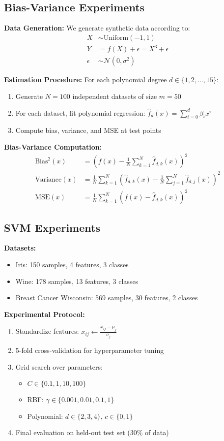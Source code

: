 \documentclass[12pt, a4paper]{article}
\begin{document}
\subsection{Bias-Variance Experiments}

\textbf{Data Generation:}
We generate synthetic data according to:
\begin{align}
X &\sim \text{Uniform}(-1, 1) \\
Y &= f(X) + \epsilon = X^3 + \epsilon \\
\epsilon &\sim \mathcal{N}(0, \sigma^2)
\end{align}

\textbf{Estimation Procedure:}
For each polynomial degree $d \in \{1, 2, \ldots, 15\}$:
\begin{enumerate}
\item Generate $N = 100$ independent datasets of size $m = 50$
\item For each dataset, fit polynomial regression: $\hat{f}_d(x) = \sum_{i=0}^d \beta_i x^i$
\item Compute bias, variance, and MSE at test points
\end{enumerate}

\textbf{Bias-Variance Computation:}
\begin{align}
\text{Bias}^2(x) &= (f(x) - \frac{1}{N}\sum_{k=1}^N \hat{f}_{d,k}(x))^2 \\
\text{Variance}(x) &= \frac{1}{N}\sum_{k=1}^N (\hat{f}_{d,k}(x) - \frac{1}{N}\sum_{j=1}^N \hat{f}_{d,j}(x))^2 \\
\text{MSE}(x) &= \frac{1}{N}\sum_{k=1}^N (f(x) - \hat{f}_{d,k}(x))^2
\end{align}

\subsection{SVM Experiments}

\textbf{Datasets:}
\begin{itemize}
\item Iris: 150 samples, 4 features, 3 classes
\item Wine: 178 samples, 13 features, 3 classes  
\item Breast Cancer Wisconsin: 569 samples, 30 features, 2 classes
\end{itemize}

\textbf{Experimental Protocol:}
\begin{enumerate}
\item Standardize features: $x_{ij} \leftarrow \frac{x_{ij} - \mu_j}{\sigma_j}$
\item 5-fold cross-validation for hyperparameter tuning
\item Grid search over parameters:
   \begin{itemize}
   \item $C \in \{0.1, 1, 10, 100\}$
   \item RBF: $\gamma \in \{0.001, 0.01, 0.1, 1\}$
   \item Polynomial: $d \in \{2, 3, 4\}$, $c \in \{0, 1\}$
   \end{itemize}
\item Final evaluation on held-out test set (30\% of data)
\end{enumerate}
\end{document}
